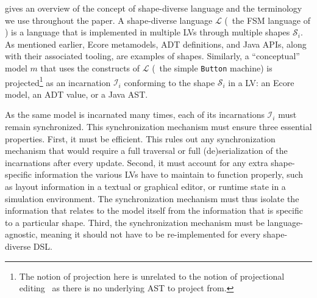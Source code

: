  gives an overview of the concept of shape-diverse language and the terminology we use throughout the paper.
A shape-diverse language $\mathcal{L}$ (\eg~the FSM language of ) is a language that is implemented in multiple LVs through multiple shapes $\mathcal{S}_i$.
As mentioned earlier, Ecore metamodels, ADT definitions, and Java APIs, along with their associated tooling, are examples of shapes.
Similarly, a ``conceptual'' model $m$ that uses the constructs of $\mathcal{L}$ (\eg~the simple {\footnotesize \texttt{Button}} machine) is projected\footnote{The notion of projection here is unrelated to the notion of projectional editing~\cite{voelter2015projecting} as there is no underlying AST to project from.} as an incarnation $\mathcal{I}_i$ conforming to the shape $\mathcal{S}_i$ in a LV: an Ecore model, an ADT value, or a Java AST.


As the same model is incarnated many times, each of its incarnations $\mathcal{I}_i$ must remain synchronized.
This synchronization mechanism must ensure three essential properties.
First, it must be efficient.
This rules out any synchronization mechanism that would require a full traversal or full (de)serialization of the incarnations after every update.
Second, it must account for any extra shape-specific information the various LVs have to maintain to function properly, such as layout information in a textual or graphical editor, or runtime state in a simulation environment.
The synchronization mechanism must thus isolate the information that relates to the model itself from the information that is specific to a particular shape.
Third, the synchronization mechanism must be language-agnostic, meaning it should not have to be re-implemented for every shape-diverse DSL.

